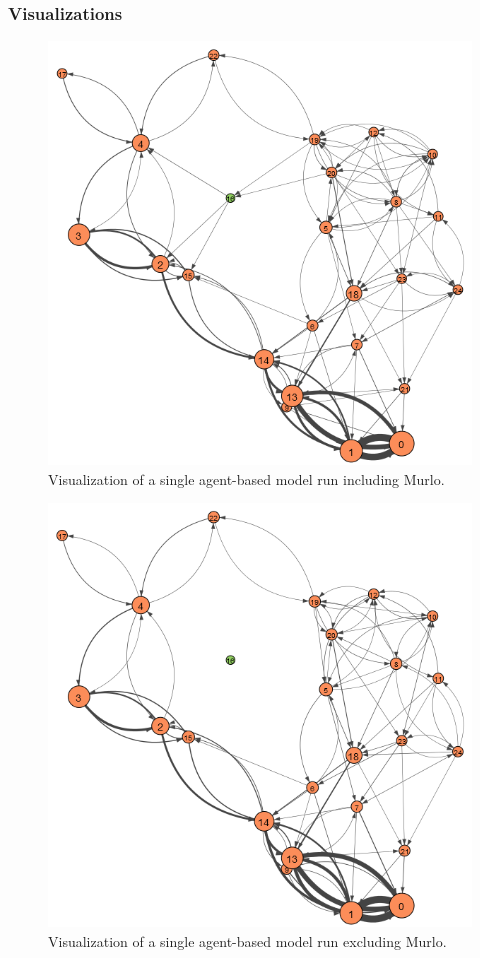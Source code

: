 \documentclass[12pt,a4paper]{thesis}
\begin{document}
\subsubsection{Visualizations}

\begin{figure}[H]
\centering
\includegraphics[width=0.9\linewidth]{./BeforeViz/agent}
\caption{Visualization of a single agent-based model run including Murlo.}
\label{fig:agentBefore}
\end{figure}

\begin{figure}[H]
\centering
\includegraphics[width=0.9\linewidth]{./AfterViz/agent}
\caption{Visualization of a single agent-based model run excluding Murlo.}
\label{fig:agentAfter}
\end{figure}
\end{document}
